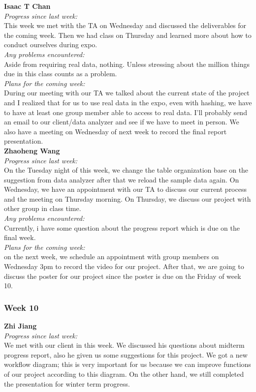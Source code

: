 \noindent\textbf{Isaac T Chan}\\
\noindent\textit{Progress since last week:}\\
This week we met with the TA on Wednesday and discussed the deliverables for the coming week. Then we had class on Thursday and learned more about how to conduct ourselves during expo.\\

\noindent\textit{Any problems encountered:}\\
Aside from requiring real data, nothing. Unless stressing about the million things due in this class counts as a problem.\\

\noindent\textit{Plans for the coming week:}\\
During our meeting with our TA we talked about the current state of the project and I realized that for us to use real data in the expo, even with hashing, we have to have at least one group member able to access to real data. I'll probably send an email to our client/data analyzer and see if we have to meet in person. We also have a meeting on Wednesday of next week to record the final report presentation.\\

\noindent\textbf{Zhaoheng Wang}\\
\noindent\textit{Progress since last week:}\\
On the Tuesday night of this week, we change the table organization base on the suggestion from data analyzer after that we reload the sample data again. On Wednesday, we have an appointment with our TA to discuss our current process and the meeting on Thursday morning. On Thursday, we discuss our project with other group in class time.\\

\noindent\textit{Any problems encountered:}\\
Currently, i have some question about the progress report which is due on the final week.\\

\noindent\textit{Plans for the coming week:}\\
on the next week, we schedule an appointment with group members on Wednesday 3pm to record the video for our project. After that, we are going to discuss the poster for our project since the poster is due on the Friday of week 10.

\subsubsection{Week 10}
\textbf{Zhi Jiang}\\
\noindent\textit{Progress since last week:}\\
We met with our client in this week. We discussed his questions about midterm progress report, also he given us some suggestions for this project. We got a new workflow diagram; this is very important for us because we can improve functions of our project according to this diagram. On the other hand, we still completed the presentation for winter term progress.\\

